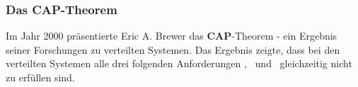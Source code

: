 \subsubsection{Das CAP-Theorem}\label{cap}

Im Jahr 2000 präsentierte Eric A. Brewer das \textbf{CAP}-Theorem - ein Ergebnis seiner Forschungen zu verteilten Systemen. Das Ergebnis zeigte, dass bei den verteilten Systemen alle drei folgenden Anforderungen \Cap, \cAp\ und \caP\ gleichzeitig nicht zu erfüllen sind.
